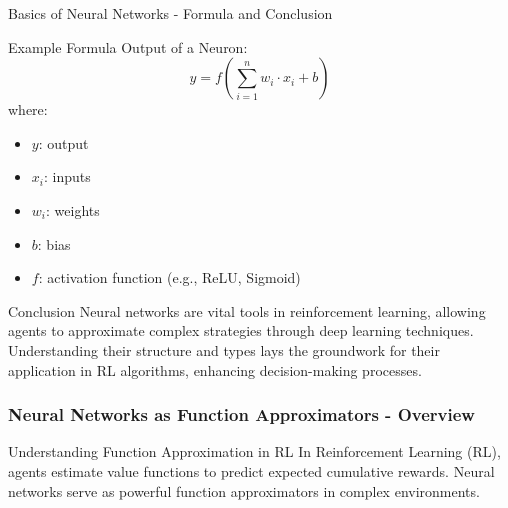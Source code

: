\documentclass[aspectratio=169]{beamer}
\begin{document}
\begin{frame}[fragile]{Basics of Neural Networks - Formula and Conclusion}
    \begin{block}{Example Formula}
        Output of a Neuron:
        \begin{equation}
            y = f\left(\sum_{i=1}^{n} w_i \cdot x_i + b\right)
        \end{equation}
        where:
        \begin{itemize}
            \item $y$: output
            \item $x_i$: inputs
            \item $w_i$: weights
            \item $b$: bias
            \item $f$: activation function (e.g., ReLU, Sigmoid)
        \end{itemize}
    \end{block}
    
    \begin{block}{Conclusion}
        Neural networks are vital tools in reinforcement learning, allowing agents to approximate complex strategies through deep learning techniques. Understanding their structure and types lays the groundwork for their application in RL algorithms, enhancing decision-making processes.
    \end{block}
\end{frame}

\begin{frame}[fragile]
    \frametitle{Neural Networks as Function Approximators - Overview}
    \begin{block}{Understanding Function Approximation in RL}
        In Reinforcement Learning (RL), agents estimate value functions to predict expected cumulative rewards. 
        Neural networks serve as powerful function approximators in complex environments.
    \end{block}
\end{frame}
\end{document}
